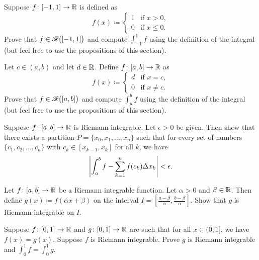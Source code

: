 \begin{exercise}
Suppose $f \colon [-1,1] \to {\mathbb{R}}$ is defined as
\begin{equation*}
f(x) \coloneqq
\begin{cases}
1 & \text{if } x > 0, \\
0 & \text{if } x \leq 0.
\end{cases}
\end{equation*}
Prove that $f \in {\mathscr{R}}\bigl([-1,1]\bigr)$ and
compute $\int_{-1}^1 f$ using the definition of the integral
(but
feel free to use the propositions of this section).
\end{exercise}

\begin{exercise}
Let $c \in (a,b)$ and let $d \in {\mathbb{R}}$.
Define $f \colon [a,b] \to {\mathbb{R}}$ as
\begin{equation*}
f(x) \coloneqq
\begin{cases}
d & \text{if } x = c, \\
0 & \text{if } x \not= c.
\end{cases}
\end{equation*}
Prove that $f \in {\mathscr{R}}\bigl([a,b]\bigr)$ and
compute
$\int_a^b f$ using the definition of the integral
(but
feel free to use the propositions of this section).
\end{exercise}

\begin{exercise} \label{exercise:taggedpartition}
Suppose $f \colon [a,b] \to {\mathbb{R}}$ is Riemann integrable.  Let $\epsilon
> 0$ be given.  Then show that there exists a partition $P = \{ x_0, x_1,
\ldots, x_n \}$
such that for every
set of numbers $\{ c_1, c_2, \ldots, c_n \}$ with
$c_k \in [x_{k-1},x_k]$ for all $k$, we have
\begin{equation*}
\left\lvert {\int_a^b f - \sum_{k=1}^n f(c_k) \Delta x_k} \right\rvert < \epsilon .
\end{equation*}
\end{exercise}

\begin{exercise}
Let $f \colon [a,b] \to {\mathbb{R}}$ be a Riemann integrable function.
Let $\alpha > 0$ and $\beta \in {\mathbb{R}}$.
Then define $g(x) \coloneqq f(\alpha x + \beta)$ on the interval
$I = [\frac{a-\beta}{\alpha}, \frac{b-\beta}{\alpha}]$.  Show
that $g$ is Riemann integrable on $I$.
\end{exercise}

\begin{exercise}
Suppose $f \colon [0,1] \to {\mathbb{R}}$ and $g \colon [0,1] \to {\mathbb{R}}$
are such that for all $x \in (0,1]$,
we have $f(x) = g(x)$.  Suppose $f$ is Riemann integrable. 
Prove $g$ is Riemann integrable and $\int_{0}^1 f = \int_{0}^1 g$.
\end{exercise}

